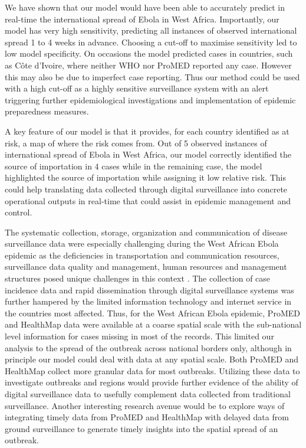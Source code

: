 \documentclass[9pt,twocolumn,twoside,lineno]{pnas-new}
\begin{document}
We have shown that our model would have been
able to accurately predict in real-time the international spread of
Ebola in West Africa. Importantly, our
model has very high sensitivity, predicting all instances of observed
international spread 1 to 4 weeks in advance. Choosing a cut-off to
maximise sensitivity led to low model specificity. On occasions the
model predicted cases in countries, such as Côte d'Ivoire, where
neither WHO nor ProMED reported any case.
However this may also be due to imperfect case reporting. Thus our
method could be used with a high cut-off as a highly sensitive
surveillance system with an alert triggering further epidemiological
investigations and implementation of epidemic preparedness measures. 

A key feature of our model is that it
provides, for each country identified as at risk, a map of where the
risk comes from. Out of 5 observed instances of international spread
of Ebola in West Africa, our model correctly identified the source
of importation in 4 cases while in the remaining case, the model
highlighted the source of importation while assigning it low relative
risk. This could help translating data collected through
digital surveillance into concrete operational outputs in real-time
that could assist in epidemic management and control. 

The systematic collection, storage, organization and communication 
of disease surveillance data were especially challenging during the 
West African Ebola epidemic as the 
deficiencies in transportation and communication resources, 
surveillance data quality and management, human resources and 
management structures posed unique challenges in this context \cite{boland2017overcoming}.
The collection of case
incidence data and rapid dissemination through digital surveillance
systems was further hampered by the limited information technology and internet 
service in the countries most affected. Thus, 
for the West African Ebola epidemic, ProMED and HealthMap data were
available at a coarse spatial scale with the sub-national level information
for cases missing in most of the records. This limited our analysis to
the spread of the outbreak across national borders only, although
in principle our
model could deal with data at any spatial scale. Both ProMED and HealthMap
collect more granular data for most outbreaks. Utilizing these data
to investigate outbreaks and regions would provide further evidence of
the ability of digital surveillance data to usefully complement data
collected from traditional
surveillance. Another interesting research
avenue would be to explore ways of integrating
timely data from ProMED and HealthMap with delayed data from ground
surveillance to generate timely insights into the spatial spread
of an outbreak.
\end{document}
